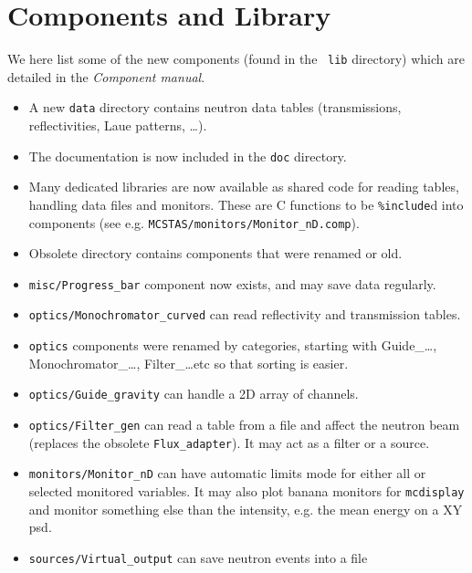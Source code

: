 \section{Components and Library} 
\label{s:new-features:components}
 
  
  We here list some of the new components (found in the \MCS\ \verb+lib+ directory) 
which are detailed in the {\it Component manual}.
  
\begin{itemize}
\item A new \verb+data+ directory contains neutron data tables (transmissions, reflectivities, Laue patterns, \ldots).
\item The documentation is now included in the \verb+doc+ directory.
\item Many dedicated libraries are now available as shared code for reading tables,
    handling data files and monitors. These are C functions to be \texttt{\%include}d
    into components (see e.g. \verb+MCSTAS/monitors/Monitor_nD.comp+).
\item Obsolete directory contains components that were renamed or old.
\item \verb+misc/Progress_bar+ component now exists, and may save data regularly.
\item \verb+optics/Monochromator_curved+ can read reflectivity and transmission tables.
\item \verb+optics+ components were renamed by categories, starting with
   Guide\_\ldots, Monochromator\_\ldots, Filter\_\ldots etc so that sorting is
   easier. 
\item \verb+optics/Guide_gravity+ can handle a 2D array of channels.
\item \verb+optics/Filter_gen+ can read a table from a file and affect the neutron
    beam (replaces the obsolete \verb+Flux_adapter+). It may act as a filter or a
    source.
\item \verb+monitors/Monitor_nD+ can have automatic limits mode for either all or 
    selected monitored variables. It may also plot banana monitors for
    \verb+mcdisplay+ and monitor something else than the intensity, e.g. the mean
    energy on a XY psd. 
\item \verb+sources/Virtual_output+ can save neutron events into a file

\end{itemize}
